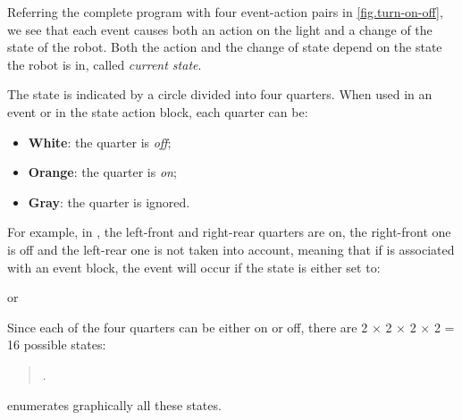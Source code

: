 Referring the complete program with four event-action
pairs in \cref{fig.turn-on-off}, we see that
each event causes both an action on the light and a change of the state
of the robot. Both the action and the change of state depend on the state the robot is in, called \emph{current state}.

\newpage


The state is indicated by a circle divided into four quarters.
When used in an event or in the state action block, each quarter can be:
\begin{itemize}
\item \textbf{White}: the quarter is \emph{off};
\item \textbf{Orange}: the quarter is \emph{on};
\item \textbf{Gray}: the quarter is ignored.
\end{itemize}

For example, in , the left-front and right-rear quarters are on, the
right-front one is off and the left-rear one is not taken into account,
meaning that if  is associated with an event block, the
event will occur if the state is either set to:
\begin{center}
\centering {}\quad or \quad {}
\end{center}

Since each of the four quarters can be either on or off, there are 2 $\times$ 2 $\times$ 2 $\times$ 2 = 16 possible states:
\begin{quote}
.
\end{quote}
 enumerates graphically all these states.




